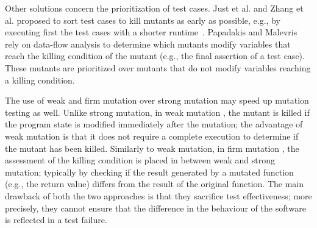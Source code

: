 Other solutions concern the prioritization of test cases. Just et al. \cite{just2012using} and Zhang et al. \cite{zhang2013faster} proposed to sort test cases to kill mutants as early as possible, e.g., by executing first the test cases with a shorter runtime~\cite{just2012using}. 
Papadakis and Malevris \cite{papadakis2011automatically} rely on data-flow analysis to determine which mutants modify variables that reach the killing condition of the mutant (e.g., the final assertion of a test case). These mutants are prioritized over mutants that do not modify variables reaching a killing condition.


The use of weak and firm mutation over strong mutation may speed up mutation testing as well.
Unlike strong mutation, 
in weak mutation \cite{ammann2016introduction}, the mutant is killed if the program state is modified immediately after the mutation; the advantage of weak mutation is that it does not require a complete execution to determine if the mutant has been killed.  Similarly to weak mutation, in firm mutation \cite{ammann2016introduction}, the assessment of the killing condition is placed in between weak and strong mutation; typically by checking if the result generated by a mutated function (e.g., the return value) differs from the result of the original function. The main drawback of both the two approaches is that they sacrifice test effectiveness; more precisely, they cannot ensure that the difference in the behaviour of the software is reflected in a test failure.


